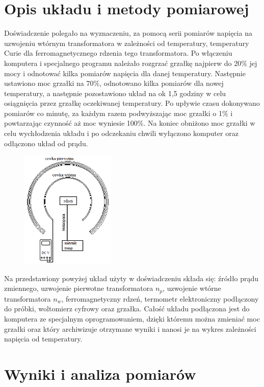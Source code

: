 \documentclass[a4paper,10pt]{article}
\begin{document}
\section{Opis układu i metody pomiarowej}
Doświadczenie polegało na wyznaczeniu, za pomocą serii pomiarów napięcia na uzwojeniu wtórnym transformatora w zależności od temperatury, temperatury Curie dla
ferromagnetycznego rdzenia tego transformatora. Po włączeniu komputera i specjalnego programu należało rozgrzać grzałkę najpierw do 20\% jej mocy i odnotować
kilka pomiarów napięcia dla danej temperatury. Następnie ustawiono moc grzałki na 70\%, odnotowano kilka pomiarów dla nowej temperatury, a następnie pozostawiono
układ na ok 1,5 godziny w celu osiągnięcia przez grzałkę oczekiwanej temperatury. Po upływie czasu dokonywano pomiarów co minutę, za każdym razem podwyższając moc grzałki o 1\% i powtarzając czynność aż moc wyniesie 100\%. Na koniec obniżono moc grzałki w celu wychłodzenia układu i po odczekaniu chwili wyłączono komputer oraz odłączono układ od prądu.
\begin{figure}[H]
\center
\includegraphics[width=0.4\textwidth]{uklad.png}
\end{figure}
Na przedstawiony powyżej układ użyty w doświadczeniu składa się: źródło prądu zmiennego, uzwojenie pierwotne transformatora $n_p$, uzwojenie wtórne transformatora $n_w$, ferromagnetyczny rdzeń, termometr elektroniczny podłączony do próbki, woltomierz cyfrowy oraz grzałka. Całość układu podłączona jest do komputera ze specjalnym oprogramowaniem, dzięki któremu można zmieniać moc grzałki oraz który archiwizuje otrzymane wyniki i nanosi je na wykres zależności napięcia od temperatury.

\section{Wyniki i analiza pomiarów}
\end{document}
